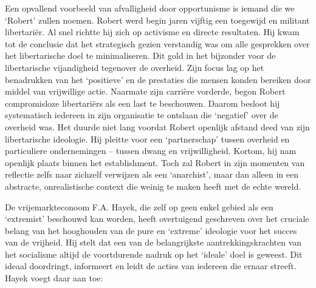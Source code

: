 \documentclass[
  a5paper,
  smalldemyvopaper,10pt,twoside,onecolumn,openright,extrafontsizes,hidelinks]{memoir}
\begin{document}
Een opvallend voorbeeld van afvalligheid door opportunisme is iemand die
we `Robert' zullen noemen. Robert werd begin jaren vijftig een toegewijd
en militant libertariër. Al snel richtte hij zich op activisme en
directe resultaten. Hij kwam tot de conclusie dat het strategisch gezien
verstandig was om alle gesprekken over het libertarische doel te
minimaliseren. Dit gold in het bijzonder voor de libertarische
vijandigheid tegenover de overheid. Zijn focus lag op het benadrukken
van het `positieve' en de prestaties die mensen konden bereiken door
middel van vrijwillige actie. Naarmate zijn carrière vorderde, begon
Robert compromisloze libertariërs als een last te beschouwen. Daarom
besloot hij systematisch iedereen in zijn organisatie te ontslaan die
`negatief' over de overheid was. Het duurde niet lang voordat Robert
openlijk afstand deed van zijn libertarische ideologie. Hij pleitte voor
een `partnerschap' tussen overheid en particuliere ondernemingen --
tussen dwang en vrijwilligheid. Kortom, hij nam openlijk plaats binnen
het establishment. Toch zal Robert in zijn momenten van reflectie zelfs
naar zichzelf verwijzen als een `anarchist', maar dan alleen in een
abstracte, onrealistische context die weinig te maken heeft met de echte
wereld.

De vrijemarkteconoom F.A. Hayek, die zelf op geen enkel gebied als een
`extremist' beschouwd kan worden, heeft overtuigend geschreven over het
cruciale belang van het hooghouden van de pure en `extreme' ideologie
voor het succes van de vrijheid. Hij stelt dat een van de belangrijkste
aantrekkingskrachten van het socialisme altijd de voortdurende nadruk op
het `ideale' doel is geweest. Dit ideaal doordringt, informeert en leidt
de acties van iedereen die ernaar streeft. Hayek voegt daar aan toe:
\end{document}
